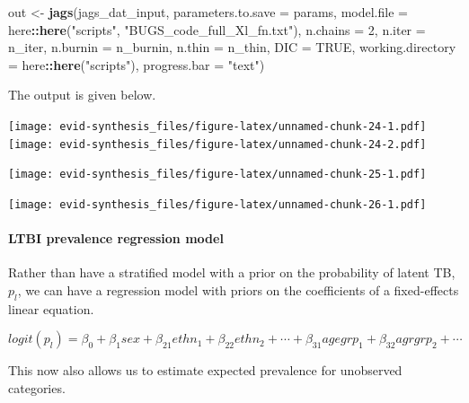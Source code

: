 \documentclass[]{article}
\newenvironment{Shaded}{\begin{snugshade}}{\end{snugshade}}
\newcommand{\DataTypeTok}[1]{\textcolor[rgb]{0.13,0.29,0.53}{#1}}
\newcommand{\DecValTok}[1]{\textcolor[rgb]{0.00,0.00,0.81}{#1}}
\newcommand{\KeywordTok}[1]{\textcolor[rgb]{0.13,0.29,0.53}{\textbf{#1}}}
\newcommand{\NormalTok}[1]{#1}
\newcommand{\OperatorTok}[1]{\textcolor[rgb]{0.81,0.36,0.00}{\textbf{#1}}}
\newcommand{\OtherTok}[1]{\textcolor[rgb]{0.56,0.35,0.01}{#1}}
\newcommand{\StringTok}[1]{\textcolor[rgb]{0.31,0.60,0.02}{#1}}
\let\oldparagraph\paragraph
\renewcommand{\paragraph}[1]{\oldparagraph{#1}\mbox{}}
\begin{document}
\begin{Shaded}
\begin{Highlighting}[]
\NormalTok{out <-}\StringTok{ }\KeywordTok{jags}\NormalTok{(jags_dat_input,}
            \DataTypeTok{parameters.to.save =}\NormalTok{ params,}
            \DataTypeTok{model.file =}\NormalTok{ here}\OperatorTok{::}\KeywordTok{here}\NormalTok{(}\StringTok{"scripts"}\NormalTok{, }\StringTok{"BUGS_code_full_Xl_fn.txt"}\NormalTok{),}
            \DataTypeTok{n.chains =} \DecValTok{2}\NormalTok{,}
            \DataTypeTok{n.iter =}\NormalTok{ n_iter,}
            \DataTypeTok{n.burnin =}\NormalTok{ n_burnin,}
            \DataTypeTok{n.thin =}\NormalTok{ n_thin,}
            \DataTypeTok{DIC =} \OtherTok{TRUE}\NormalTok{,}
            \DataTypeTok{working.directory =}\NormalTok{ here}\OperatorTok{::}\KeywordTok{here}\NormalTok{(}\StringTok{"scripts"}\NormalTok{),}
            \DataTypeTok{progress.bar =} \StringTok{"text"}\NormalTok{)}
\end{Highlighting}
\end{Shaded}

The output is given below.

\texttt{[image: evid-synthesis\_files/figure-latex/unnamed-chunk-24-1.pdf]}
\texttt{[image: evid-synthesis\_files/figure-latex/unnamed-chunk-24-2.pdf]}

\texttt{[image: evid-synthesis\_files/figure-latex/unnamed-chunk-25-1.pdf]}

\texttt{[image: evid-synthesis\_files/figure-latex/unnamed-chunk-26-1.pdf]}

\hypertarget{ltbi-prevalence-regression-model}{%
\paragraph{LTBI prevalence regression
model}\label{ltbi-prevalence-regression-model}}

Rather than have a stratified model with a prior on the probability of
latent TB, \(p_l\), we can have a regression model with priors on the
coefficients of a fixed-effects linear equation.

\[
logit(p_l) = \beta_0 + \beta_1 sex + \beta_{21} ethn_1 + \beta_{22} ethn_2 + \cdots + \beta_{31} agegrp_1 + \beta_{32} agrgrp_2 + \cdots
\]

This now also allows us to estimate expected prevalence for unobserved
categories.
\end{document}
